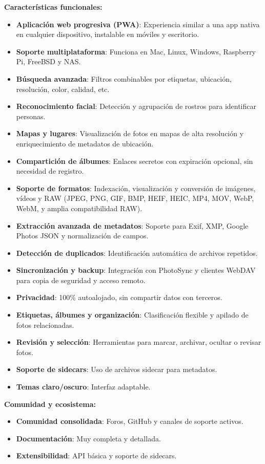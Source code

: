 \textbf{Características funcionales:}
\begin{itemize}
    \item \textbf{Aplicación web progresiva (PWA)}: Experiencia similar a una app nativa en cualquier dispositivo, instalable en móviles y escritorio.
    \item \textbf{Soporte multiplataforma}: Funciona en Mac, Linux, Windows, Raspberry Pi, FreeBSD y NAS.
    \item \textbf{Búsqueda avanzada}: Filtros combinables por etiquetas, ubicación, resolución, color, calidad, etc.
    \item \textbf{Reconocimiento facial}: Detección y agrupación de rostros para identificar personas.
    \item \textbf{Mapas y lugares}: Visualización de fotos en mapas de alta resolución y enriquecimiento de metadatos de ubicación.
    \item \textbf{Compartición de álbumes}: Enlaces secretos con expiración opcional, sin necesidad de registro.
    \item \textbf{Soporte de formatos}: Indexación, visualización y conversión de imágenes, vídeos y RAW (JPEG, PNG, GIF, BMP, HEIF, HEIC, MP4, MOV, WebP, WebM, y amplia compatibilidad RAW).
    \item \textbf{Extracción avanzada de metadatos}: Soporte para Exif, XMP, Google Photos JSON y normalización de campos.
    \item \textbf{Detección de duplicados}: Identificación automática de archivos repetidos.
    \item \textbf{Sincronización y backup}: Integración con PhotoSync y clientes WebDAV para copia de seguridad y acceso remoto.
    \item \textbf{Privacidad}: 100\% autoalojado, sin compartir datos con terceros.
    \item \textbf{Etiquetas, álbumes y organización}: Clasificación flexible y apilado de fotos relacionadas.
    \item \textbf{Revisión y selección}: Herramientas para marcar, archivar, ocultar o revisar fotos.
    \item \textbf{Soporte de sidecars}: Uso de archivos sidecar para metadatos.
    \item \textbf{Temas claro/oscuro}: Interfaz adaptable.
\end{itemize}

\textbf{Comunidad y ecosistema:}
\begin{itemize}
    \item \textbf{Comunidad consolidada}: Foros, GitHub y canales de soporte activos.
    \item \textbf{Documentación}: Muy completa y detallada.
    \item \textbf{Extensibilidad}: API básica y soporte de sidecars.
\end{itemize}

